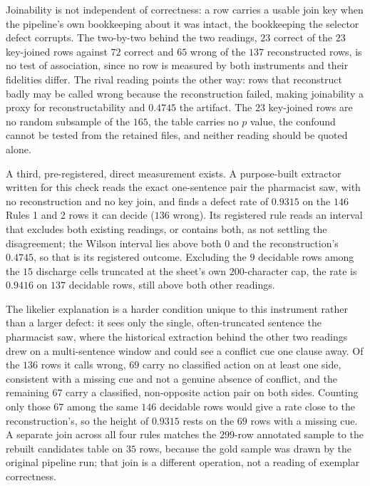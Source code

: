 Joinability is not independent of correctness: a row carries a usable join key when the
pipeline's own bookkeeping about it was intact, the bookkeeping the selector defect corrupts. The
two-by-two behind the two readings, $23$ correct of the $23$ key-joined rows against $72$ correct
and $65$ wrong of the $137$ reconstructed rows, is no test of association, since no row is
measured by both instruments and their fidelities differ. The rival reading points the other way:
rows that reconstruct badly may be called wrong because the reconstruction failed, making
joinability a proxy for reconstructability and $0.4745$ the artifact. The $23$ key-joined rows are
no random subsample of the $165$, the table carries no $p$ value, the confound cannot be tested
from the retained files, and neither reading should be quoted alone.

A third, pre-registered, direct measurement exists. A purpose-built extractor written for this
check reads the exact one-sentence pair the pharmacist saw, with no reconstruction and no key join,
and finds a defect rate of $0.9315$ on the $146$ Rules 1 and 2 rows it can decide ($136$ wrong).
Its registered rule reads an interval that excludes both existing readings, or contains both, as
not settling the disagreement; the Wilson interval lies above both $0$ and the reconstruction's
$0.4745$, so that is its registered outcome. Excluding the $9$ decidable rows among the $15$
discharge cells truncated at the sheet's own $200$-character cap, the rate is $0.9416$ on $137$
decidable rows, still above both other readings.

The likelier explanation is a harder condition unique to this instrument rather than a larger
defect: it sees only the single, often-truncated sentence the pharmacist saw, where the historical
extraction behind the other two readings drew on a multi-sentence window and could see a conflict
cue one clause away. Of the $136$ rows it calls wrong, $69$ carry no classified action on at least
one side, consistent with a missing cue and not a genuine absence of conflict, and the remaining
$67$ carry a classified, non-opposite action pair on both sides. Counting only those $67$ among
the same $146$ decidable rows would give a rate close to the reconstruction's, so the height of
$0.9315$ rests on the $69$ rows with a missing cue. A separate join across all four rules matches
the $299$-row annotated sample to the rebuilt candidates table on $35$ rows, because the gold
sample was drawn by the original pipeline run; that join is a different operation, not a reading
of exemplar correctness.


